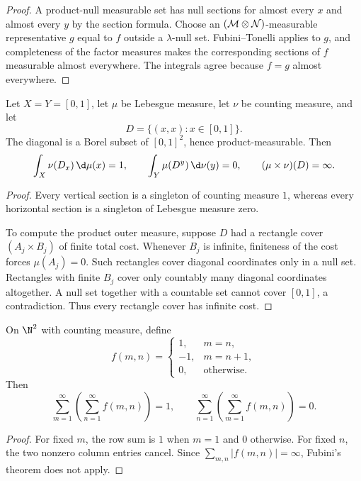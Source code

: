 \begin{proof}
A product-null measurable set has null sections for almost every $x$ and almost every $y$ by the section formula. Choose an $(\mathcal{M}\otimes\mathcal{N})$-measurable representative $g$ equal to $f$ outside a $\lambda$-null set. Fubini--Tonelli applies to $g$, and completeness of the factor measures makes the corresponding sections of $f$ measurable almost everywhere. The integrals agree because $f=g$ almost everywhere.
\end{proof}

\begin{exercise}
Let $X=Y=[0,1]$, let $\mu$ be Lebesgue measure, let $\nu$ be counting measure, and let
\[
D=\{(x,x):x\in[0,1]\}.
\]
The diagonal is a Borel subset of $[0,1]^2$, hence product-measurable. Then
\[
\int_X\nu(D_x)\,\d\mu(x)=1,
\qquad
\int_Y\mu(D^y)\,\d\nu(y)=0,
\qquad
(\mu\times\nu)(D)=\infty.
\]
\end{exercise}

\begin{proof}
Every vertical section is a singleton of counting measure $1$, whereas every horizontal section is a singleton of Lebesgue measure zero.

To compute the product outer measure, suppose $D$ had a rectangle cover $(A_j\times B_j)$ of finite total cost. Whenever $B_j$ is infinite, finiteness of the cost forces $\mu(A_j)=0$. Such rectangles cover diagonal coordinates only in a null set. Rectangles with finite $B_j$ cover only countably many diagonal coordinates altogether. A null set together with a countable set cannot cover $[0,1]$, a contradiction. Thus every rectangle cover has infinite cost.
\end{proof}

\begin{exercise}
On $\N^2$ with counting measure, define
\[
f(m,n)=
\begin{cases}
1,&m=n,\\
-1,&m=n+1,\\
0,&\text{otherwise}.
\end{cases}
\]
Then
\[
\sum_{m=1}^{\infty}\left(\sum_{n=1}^{\infty}f(m,n)\right)=1,
\qquad
\sum_{n=1}^{\infty}\left(\sum_{m=1}^{\infty}f(m,n)\right)=0.
\]
\end{exercise}

\begin{proof}
For fixed $m$, the row sum is $1$ when $m=1$ and $0$ otherwise. For fixed $n$, the two nonzero column entries cancel. Since $\sum_{m,n}|f(m,n)|=\infty$, Fubini's theorem does not apply.
\end{proof}

